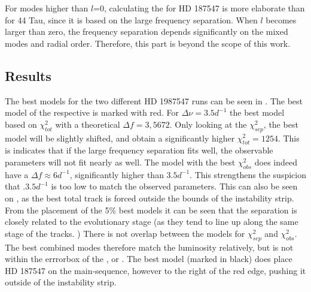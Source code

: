 For modes higher than $l$=0, calculating the \chis for HD 187547 is more elaborate than for 44 Tau, since it is based on the large frequency separation. When $l$ becomes larger than zero, the frequency separation depends significantly on the mixed modes and radial order. Therefore, this part is beyond the scope of this work. 

\subsection{Results}
The best models for the two different HD 1987547 runs can be seen in . The best model of the respective \chis is marked with red. For $\Delta \nu=3.5 d^{-1}$ the best model based on $\chi_{tot}^2$ with a theoretical $\Delta f = 3,5672$. Only looking at the $\chi_{sep}^2$, the best model will be slightly shifted, and obtain a significantly higher $\chi_{tot}^2=1254$. This is indicates that if the large frequency separation fits well, the observable parameters will not fit nearly as well. The model with the best $\chi_{obs}^2$ does indeed have a $\Delta f \approx 6d^{-1}$, significantly higher than $3.5d^{-1}$. This strengthens the suspicion that $.3.5 d^{-1}$ is too low to match the observed parameters. This can also be seen on , as the best total track is forced outside the bounds of the instability strip.  From the placement of the 5\% best models it can be seen that the separation is closely related to the evolutionary stage (as they tend to line up along the same stage of the tracks. ) There is not overlap between the models for $\chi_{sep}^2$ and $\chi_{obs}^2$. The best combined modes therefore match the luminosity relatively, but is not within the errrorbox of the \teff, or \lum. The best model (marked in black) does place HD 187547 on the main-sequence, however to the right of the red edge, pushing it outside of the instability strip. 
